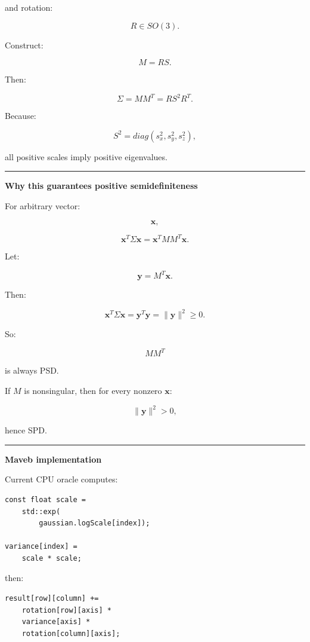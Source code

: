 and rotation:

\[
R\in SO(3).
\]

Construct:

\[
M=RS.
\]

Then:

\[
\boxed{
\Sigma
=
MM^T
=
RS^2R^T.
}
\]

Because:

\[
S^2=
diag(
s_x^2,
s_y^2,
s_z^2
),
\]

all positive scales imply positive eigenvalues.

\begin{center}\rule{0.5\linewidth}{0.5pt}\end{center}

\textbf{Why this guarantees positive semidefiniteness}

For arbitrary vector:

\[
\mathbf x,
\]

\[
\mathbf x^T
\Sigma
\mathbf x
=
\mathbf x^T
MM^T
\mathbf x.
\]

Let:

\[
\mathbf y=M^T\mathbf x.
\]

Then:

\[
\mathbf x^T
\Sigma
\mathbf x
=
\mathbf y^T\mathbf y
=
\|\mathbf y\|^2
\ge0.
\]

So:

\[
MM^T
\]

is always PSD.

If \(M\) is nonsingular, then for every nonzero \(\mathbf x\):

\[
\|\mathbf y\|^2>0,
\]

hence SPD.

\begin{center}\rule{0.5\linewidth}{0.5pt}\end{center}

\textbf{Maveb implementation}

Current CPU oracle computes:

\begin{verbatim}
const float scale =
    std::exp(
        gaussian.logScale[index]);

variance[index] =
    scale * scale;
\end{verbatim}

then:

\begin{verbatim}
result[row][column] +=
    rotation[row][axis] *
    variance[axis] *
    rotation[column][axis];
\end{verbatim}

